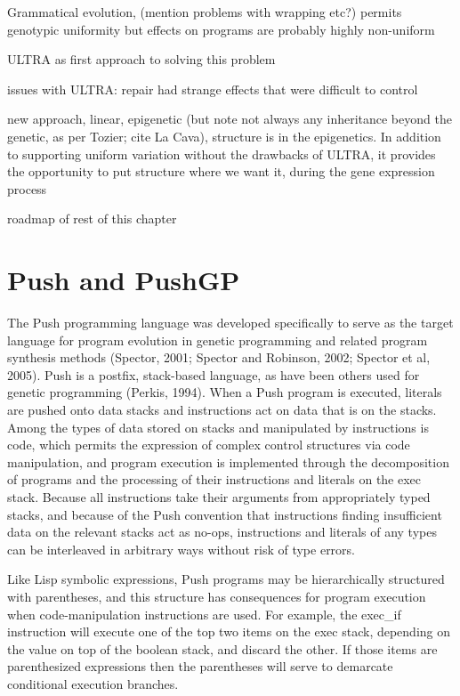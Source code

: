 Grammatical evolution, (mention problems with wrapping etc?) permits genotypic uniformity but effects on programs are probably highly non-uniform 

ULTRA as first approach to solving this problem

issues with ULTRA: repair had strange effects that were difficult to control

new approach, linear, epigenetic (but note not always any inheritance beyond the genetic, as per Tozier; cite La Cava), structure is in the epigenetics. In addition to supporting uniform variation without the drawbacks of ULTRA, it provides the opportunity to put structure where we want it, during the gene expression process

roadmap of rest of this chapter




\section{Push and PushGP}

The Push programming language was developed specifically to serve as the target language for program evolution in genetic programming and related program synthesis methods
(Spector, 2001; Spector and Robinson, 2002; Spector et al, 2005). Push is a postfix, stack-based language, as have been others used for genetic programming (Perkis, 1994). 
When a Push program is executed, literals are pushed
onto data stacks and instructions act on data that is on the stacks.
Among the types of data stored on stacks and manipulated by instructions is {\ttfamily code}, which permits the expression of complex control structures via code manipulation, and program execution is implemented through the decomposition of programs and the processing of their instructions and literals on the {\ttfamily exec} stack.
Because all instructions take their arguments from appropriately typed stacks, and because of the Push convention that instructions finding insufficient data on the relevant stacks
act as {\ttfamily no-op}s, instructions and literals of any types can be interleaved in arbitrary ways without risk of type errors.

Like Lisp symbolic expressions, Push programs may be hierarchically
structured with parentheses, and this structure has consequences for program execution when code-manipulation instructions are used. For example, the {\ttfamily exec\_if} instruction will execute one of the top two items on the {\ttfamily exec} stack, depending on the value on top of the {\ttfamily boolean} stack, and discard the other. If those items are parenthesized expressions then the parentheses will serve to demarcate conditional execution branches.


